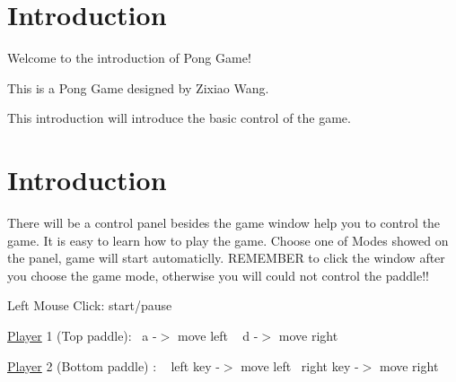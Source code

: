 \hypertarget{index_intro_sec}{}\section{Introduction}\label{index_intro_sec}
Welcome to the introduction of Pong Game!

This is a Pong Game designed by Zixiao Wang.

This introduction will introduce the basic control of the game.\hypertarget{index_intro_sec}{}\section{Introduction}\label{index_intro_sec}
There will be a control panel besides the game window help you to control the game. It is easy to learn how to play the game. Choose one of Modes showed on the panel, game will start automaticlly. R\+E\+M\+E\+M\+B\+E\+R to click the window after you choose the game mode, otherwise you will could not control the paddle!!

Left Mouse Click\+: start/pause

\hyperlink{classPlayer}{Player} 1 (Top paddle)\+:~\newline
a -\/$>$ move left ~\newline
d -\/$>$ move right

\hyperlink{classPlayer}{Player} 2 (Bottom paddle) \+: ~\newline
left key -\/$>$ move left~\newline
right key -\/$>$ move right 